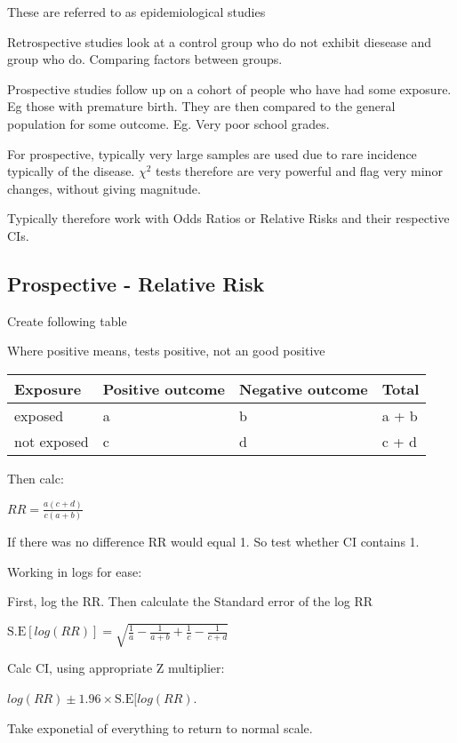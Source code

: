 \documentclass[
  letterpaper,
  DIV=11,
  numbers=noendperiod]{scrreprt}
\begin{document}
These are referred to as epidemiological studies

Retrospective studies look at a control group who do not exhibit
diesease and group who do. Comparing factors between groups.

Prospective studies follow up on a cohort of people who have had some
exposure. Eg those with premature birth. They are then compared to the
general population for some outcome. Eg. Very poor school grades.

For prospective, typically very large samples are used due to rare
incidence typically of the disease. \(\chi^2\) tests therefore are very
powerful and flag very minor changes, without giving magnitude.

Typically therefore work with Odds Ratios or Relative Risks and their
respective CIs.

\hypertarget{prospective---relative-risk}{%
\subsection{Prospective - Relative
Risk}\label{prospective---relative-risk}}

Create following table

Where positive means, tests positive, not an good positive

\begin{longtable}[]{@{}llll@{}}
\toprule()
Exposure & Positive outcome & Negative outcome & Total \\
\midrule()
\endhead
exposed & a & b & a + b \\
not exposed & c & d & c + d \\
\bottomrule()
\end{longtable}

Then calc:

\(RR = \frac{a(c+d)}{c(a+b)}\)

If there was no difference RR would equal 1. So test whether CI contains
1.

Working in logs for ease:

First, log the RR. Then calculate the Standard error of the log RR

\(\text{S.E}[log(RR)] = \sqrt{  \frac{1}{a} -  \frac{1}{a+b}+  \frac{1}{c}-  \frac{1}{c+d} }\)

Calc CI, using appropriate Z multiplier:

\(log(RR) \pm 1.96 \times \text{S.E}[log(RR)\).

Take exponetial of everything to return to normal scale.
\end{document}
